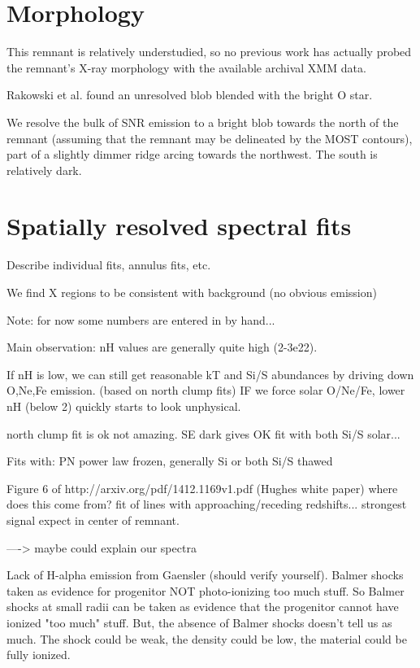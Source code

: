 \documentclass[twocolumn,tighten,trackchanges]{aastex6}
\begin{document}
\section{Morphology}

This remnant is relatively understudied, so no previous work has actually
probed the remnant's X-ray morphology with the available archival XMM data.

Rakowski et al. found an unresolved blob blended with the bright O star.

We resolve the bulk of SNR emission to a bright blob towards the north of the
remnant (assuming that the remnant may be delineated by the MOST contours),
part of a slightly dimmer ridge arcing towards the northwest.
The south is relatively dark.

\section{Spatially resolved spectral fits}

Describe individual fits, annulus fits, etc.

We find X regions to be consistent with background (no obvious emission)

Note: for now some numbers are entered in by hand...

Main observation: nH values are generally quite high (2-3e22).

If nH is low, we can still get reasonable kT and Si/S abundances
by driving down O,Ne,Fe emission. (based on north clump fits)
IF we force solar O/Ne/Fe, lower nH (below 2) quickly starts to look
unphysical.

north clump fit is ok not amazing.
SE dark gives OK fit with both Si/S solar...

Fits with: PN power law frozen, generally Si or both Si/S thawed


Figure 6 of http://arxiv.org/pdf/1412.1169v1.pdf (Hughes white paper)
where does this come from? fit of lines with approaching/receding redshifts...
strongest signal expect in center of remnant.

----> maybe could explain our spectra

Lack of H-alpha emission from Gaensler (should verify yourself).
Balmer shocks taken as evidence for progenitor NOT photo-ionizing too much
stuff.  So Balmer shocks at small radii can be taken as evidence that the
progenitor cannot have ionized "too much" stuff.
But, the absence of Balmer shocks doesn't tell us as much.
The shock could be weak, the density could be low, the material could be fully
ionized.
\end{document}
